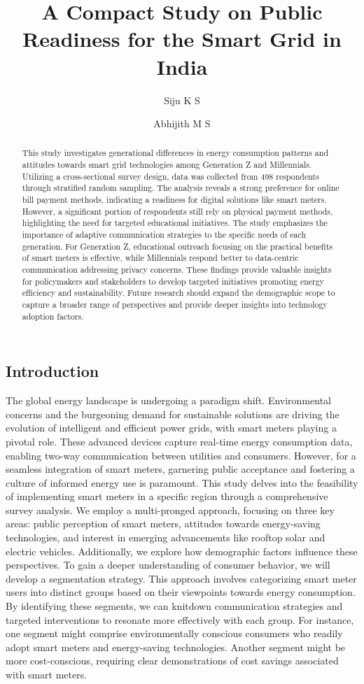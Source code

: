\documentclass[
  letterpaper,
  DIV=11,
  numbers=noendperiod]{scrartcl}
\title{A Compact Study on Public Readiness for the Smart Grid in India}
\author{Siju K S \and Abhijith M S}
\date{}
\begin{document}
\maketitle
\begin{abstract}
This study investigates generational differences in energy consumption
patterns and attitudes towards smart grid technologies among Generation
Z and Millennials. Utilizing a cross-sectional survey design, data was
collected from 498 respondents through stratified random sampling. The
analysis reveals a strong preference for online bill payment methods,
indicating a readiness for digital solutions like smart meters. However,
a significant portion of respondents still rely on physical payment
methods, highlighting the need for targeted educational initiatives. The
study emphasizes the importance of adaptive communication strategies to
the specific needs of each generation. For Generation Z, educational
outreach focusing on the practical benefits of smart meters is
effective, while Millennials respond better to data-centric
communication addressing privacy concerns. These findings provide
valuable insights for policymakers and stakeholders to develop targeted
initiatives promoting energy efficiency and sustainability. Future
research should expand the demographic scope to capture a broader range
of perspectives and provide deeper insights into technology adoption
factors.
\end{abstract}


\subsection{Introduction}\label{introduction}

The global energy landscape is undergoing a paradigm shift.
Environmental concerns and the burgeoning demand for sustainable
solutions are driving the evolution of intelligent and efficient power
grids, with smart meters playing a pivotal role. These advanced devices
capture real-time energy consumption data, enabling two-way
communication between utilities and consumers. However, for a seamless
integration of smart meters, garnering public acceptance and fostering a
culture of informed energy use is paramount. This study delves into the
feasibility of implementing smart meters in a specific region through a
comprehensive survey analysis. We employ a multi-pronged approach,
focusing on three key areas: public perception of smart meters,
attitudes towards energy-saving technologies, and interest in emerging
advancements like rooftop solar and electric vehicles. Additionally, we
explore how demographic factors influence these perspectives. To gain a
deeper understanding of consumer behavior, we will develop a
segmentation strategy. This approach involves categorizing smart meter
users into distinct groups based on their viewpoints towards energy
consumption. By identifying these segments, we can knitdown
communication strategies and targeted interventions to resonate more
effectively with each group. For instance, one segment might comprise
environmentally conscious consumers who readily adopt smart meters and
energy-saving technologies. Another segment might be more
cost-conscious, requiring clear demonstrations of cost savings
associated with smart meters.
\end{document}
